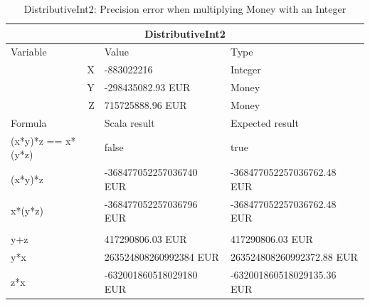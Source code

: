 \begin{table}[h!]
\centering
\begin{tabular}{lll}
\hline
\multicolumn{3}{|c|}{DistributiveInt2}                                                                                \\ \hline
\multicolumn{1}{|l}{Variable}           & Value                   & \multicolumn{1}{l|}{Type}                       \\
\multicolumn{1}{|r}{X}                  & -883022216              & \multicolumn{1}{l|}{Integer}                    \\
\multicolumn{1}{|r}{Y}                  & -298435082.93 EUR       & \multicolumn{1}{l|}{Money}                      \\
\multicolumn{1}{|r}{Z}                  & 715725888.96 EUR        & \multicolumn{1}{l|}{Money}                      \\ \hline
\multicolumn{1}{|l}{Formula}            & Scala result            & \multicolumn{1}{l|}{Expected result}            \\
\multicolumn{1}{|l}{(x*y)*z == x*(y*z)} & false                   & \multicolumn{1}{l|}{true}                       \\
\multicolumn{1}{|l}{(x*y)*z}            & -368477052257036740 EUR & \multicolumn{1}{l|}{-368477052257036762.48 EUR} \\
\multicolumn{1}{|l}{x*(y*z)}            & -368477052257036796 EUR & \multicolumn{1}{l|}{-368477052257036762.48 EUR} \\
\multicolumn{1}{|l}{}                   &                         & \multicolumn{1}{l|}{}                           \\
\multicolumn{1}{|l}{y+z}                & 417290806.03 EUR        & \multicolumn{1}{l|}{417290806.03 EUR}           \\
\multicolumn{1}{|l}{y*x}                & 263524808260992384 EUR  & \multicolumn{1}{l|}{263524808260992372.88 EUR}  \\
\multicolumn{1}{|l}{z*x}                & -632001860518029180 EUR & \multicolumn{1}{l|}{-632001860518029135.36 EUR} \\ \hline
\end{tabular}
\caption{DistributiveInt2: Precision error when multiplying Money with an Integer}
\label{ch4_init_check_DistributiveInt2}
\end{table}
\\

